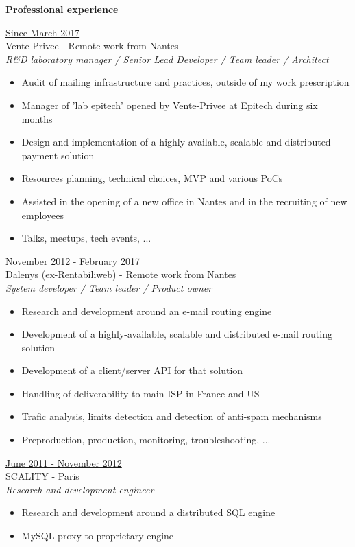 \documentclass[a4paper,10pt]{letter}
\begin{document}
\underline{\textbf{Professional experience}}\\
\begin{description}
\item{\underline{Since March 2017}}\\
  Vente-Privee - Remote work from Nantes\\
  \textit{R\&D laboratory manager / Senior Lead Developer / Team leader / Architect}
  \begin{itemize}
    \item Audit of mailing infrastructure and practices, outside of my work prescription
    \item Manager of 'lab epitech' opened by Vente-Privee at Epitech during six months
    \item Design and implementation of a highly-available, scalable and distributed payment solution
    \item Resources planning, technical choices, MVP and various PoCs
    \item Assisted in the opening of a new office in Nantes and in the recruiting of new employees
    \item Talks, meetups, tech events, ...\\
  \end{itemize}

\item{\underline{November 2012 - February 2017}}\\
  Dalenys (ex-Rentabiliweb) - Remote work from Nantes\\
  \textit{System developer / Team leader / Product owner}
  \begin{itemize}
  \item Research and development around an e-mail routing engine
  \item Development of a highly-available, scalable and distributed e-mail routing solution
  \item Development of a client/server API for that solution
  \item Handling of deliverability to main ISP in France and US
  \item Trafic analysis, limits detection and detection of anti-spam mechanisms
  \item Preproduction, production, monitoring, troubleshooting, ...\\
  \end{itemize}

\item{\underline{June 2011 - November 2012}}\\
  SCALITY - Paris\\
  \textit{Research and development engineer}
  \begin{itemize}
  \item Research and development around a distributed SQL engine
  \item MySQL proxy to proprietary engine\\
  \end{itemize}


\end{description}
\end{document}
